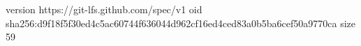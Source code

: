 version https://git-lfs.github.com/spec/v1
oid sha256:d9f18f5f30ed4c5ac60744f636044d962cf16ed4ced83a0b5ba6cef50a9770ca
size 59
